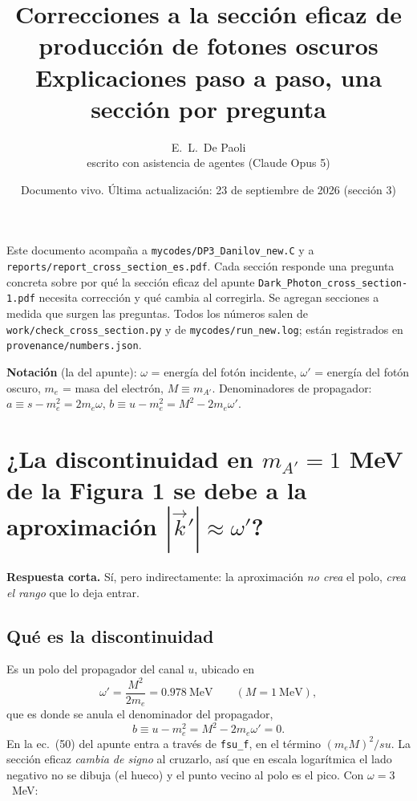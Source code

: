 \documentclass[11pt,a4paper]{article}
\title{Correcciones a la sección eficaz de producción de fotones oscuros\\[4pt]
\large Explicaciones paso a paso, una sección por pregunta}
\author{E.~L.~De Paoli\\[2pt]\small escrito con asistencia de agentes (Claude Opus 5)}
\date{Documento vivo. Última actualización: 23 de septiembre de 2026 (sección 3)}
\newcommand{\Ap}{A'}
\newcommand{\wpr}{\omega'}
\begin{document}
\maketitle

\noindent\sloppy
Este documento acompaña a \texttt{mycodes/DP3\_Danilov\_new.C} y a
\texttt{reports/report\_cross\_section\_es.pdf}. Cada sección responde una pregunta concreta sobre por qué la
sección eficaz del apunte \texttt{Dark\_Photon\_cross\_section-1.pdf} necesita corrección y qué cambia al corregirla.
Se agregan secciones a medida que surgen las preguntas. Todos los números salen de
\texttt{work/check\_cross\_section.py} y de \texttt{mycodes/run\_new.log}; están registrados en
\texttt{provenance/numbers.json}.

\medskip
\noindent\textbf{Notación} (la del apunte): $\omega$ = energía del fotón incidente, $\wpr$ = energía del fotón oscuro,
$m_e$ = masa del electrón, $M \equiv m_{\Ap}$. Denominadores de propagador:
$a \equiv s-m_e^2 = 2m_e\omega$, $b \equiv u-m_e^2 = M^2-2m_e\wpr$.

\tableofcontents

\section{¿La discontinuidad en \texorpdfstring{$m_{\Ap}=1$}{mA'=1} MeV de la Figura 1 se debe a la aproximación \texorpdfstring{$|\vec k'|\approx\wpr$}{|k'| ~ w'}?}

\noindent\textbf{Respuesta corta.} Sí, pero indirectamente: la aproximación \emph{no crea} el polo, \emph{crea el
rango} que lo deja entrar.

\subsection{Qué es la discontinuidad}
Es un polo del propagador del canal $u$, ubicado en
\begin{equation}
\wpr=\frac{M^2}{2m_e}=0.978~\text{MeV}\qquad (M=1~\text{MeV}),
\label{eq:polo}
\end{equation}
que es donde se anula el denominador del propagador,
\begin{equation}
b\equiv u-m_e^2=M^2-2m_e\wpr=0 .
\end{equation}
En la ec.~(50) del apunte entra a través de \texttt{fsu\_f}, en el término $(m_e M)^2/su$. La sección eficaz
\emph{cambia de signo} al cruzarlo, así que en escala logarítmica el lado negativo no se dibuja (el hueco) y el punto
vecino al polo es el pico. Con $\omega=3$~MeV:
\end{document}
